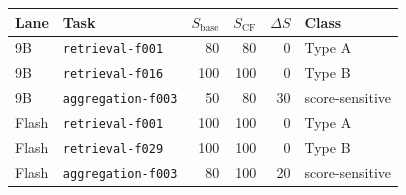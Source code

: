 \begin{tabular}{llrrrl}
\toprule
Lane & Task & $S_{\mathrm{base}}$ & $S_{\mathrm{CF}}$ & $\Delta S$ & Class \\
\midrule
9B & \texttt{retrieval-f001} & 80 & 80 & 0 & Type A \\
9B & \texttt{retrieval-f016} & 100 & 100 & 0 & Type B \\
9B & \texttt{aggregation-f003} & 50 & 80 & 30 & score-sensitive \\
Flash & \texttt{retrieval-f001} & 100 & 100 & 0 & Type A \\
Flash & \texttt{retrieval-f029} & 100 & 100 & 0 & Type B \\
Flash & \texttt{aggregation-f003} & 80 & 100 & 20 & score-sensitive \\
\bottomrule
\end{tabular}
